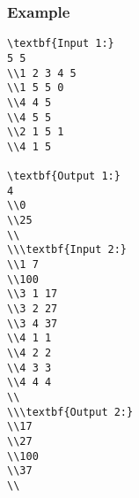 \subsubsection{   Example  }
\begin{verbatim}
\textbf{Input 1:}
5 5 
\\1 2 3 4 5 
\\1 5 5 0 
\\4 4 5 
\\4 5 5 
\\2 1 5 1 
\\4 1 5

\textbf{Output 1:}
4
\\0
\\25 
\\
\\\textbf{Input 2:}
\\1 7 
\\100 
\\3 1 17 
\\3 2 27 
\\3 4 37 
\\4 1 1 
\\4 2 2 
\\4 3 3 
\\4 4 4
\\
\\\textbf{Output 2:}
\\17 
\\27 
\\100
\\37
\\\end{verbatim}